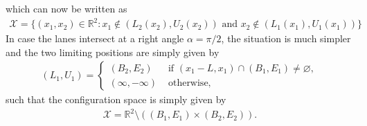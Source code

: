 \documentclass[a4paper]{report}
\theoremstyle{definition}
\theoremstyle{plain}
\begin{document}
which can now be written as
\begin{align}
  \mathcal{X} = \{ (x_{1}, x_{2}) \in \mathbb{R}^{2} : x_{1} \notin (L_{2}(x_{2}), U_{2}(x_{2})) \text{ and } x_{2} \notin (L_{1}(x_{1}), U_{1}(x_{1})) \}
\end{align}
%
In case the lanes intersect at a right angle $\alpha = \pi / 2$, the situation
is much simpler and the two limiting positions are simply given by
\begin{align}
  (L_{1}, U_{1}) =
  \begin{cases}
    (B_{2},  E_{2})    &\text{ if } (x_{1} - L, x_{1}) \cap (B_{1}, E_{1}) \neq \varnothing , \\
    (\infty, -\infty) &\text{ otherwise, }
  \end{cases}
\end{align}
such that the configuration space is simply given by
\begin{align}
  \mathcal{X} = \mathbb{R}^{2} \setminus ( (B_{1},E_{1}) \times (B_{2}, E_{2}) ) .
\end{align}



\end{document}
